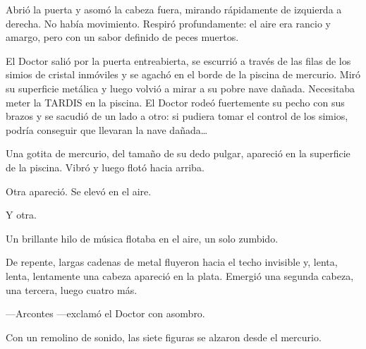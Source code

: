 Abrió la puerta y asomó la cabeza fuera, mirando rápidamente de
izquierda a derecha. No había movimiento. Respiró profundamente: el aire
era rancio y amargo, pero con un sabor definido de peces muertos.

El Doctor salió por la puerta entreabierta, se escurrió a través de las
filas de los simios de cristal inmóviles y se agachó en el borde de la
piscina de mercurio. Miró su superficie metálica y luego volvió a mirar
a su pobre nave dañada. Necesitaba meter la TARDIS en la piscina. El
Doctor rodeó fuertemente su pecho con sus brazos y se sacudió de un lado
a otro: si pudiera tomar el control de los simios, podría conseguir que
llevaran la nave dañada\ldots{}

Una gotita de mercurio, del tamaño de su dedo pulgar, apareció en la
superficie de la piscina. Vibró y luego flotó hacia arriba.

Otra apareció. Se elevó en el aire.

Y otra.

Un brillante hilo de música flotaba en el aire, un solo zumbido.

De repente, largas cadenas de metal fluyeron hacia el techo invisible y,
lenta, lenta, lentamente una cabeza apareció en la plata. Emergió una
segunda cabeza, una tercera, luego cuatro más.

---Arcontes ---exclamó el Doctor con asombro.

Con un remolino de sonido, las siete figuras se alzaron desde el
mercurio.